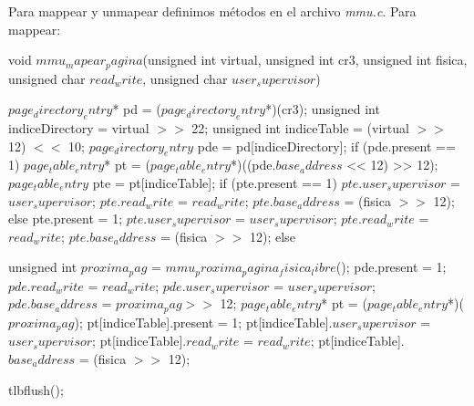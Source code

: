 Para mappear y unmapear definimos m\'etodos en el archivo \textit{mmu.c}.
Para mappear:
\begin{algorithmic}
    \State \tab void $mmu_mapear_pagina$(unsigned int virtual, unsigned int cr3, \State \tab unsigned int fisica, unsigned char $read_write$, unsigned char $user_supervisor$) {

  \State \tab \tab $page_directory_entry$* pd = ($page_directory_entry$*)(cr3);
  \State \tab \tab unsigned int indiceDirectory = virtual $>>$ 22;
  \State \tab \tab unsigned int indiceTable = (virtual $>>$ 12) $<<$ 10;
  \State \tab \tab $page_directory_entry$ pde = pd[indiceDirectory];
  \State \tab \tab if (pde.present == 1) {
    \State \tab \tab \tab $page_table_entry$* pt = ($page_table_entry$*)((pde.$base_address$ << 12) >> 12);
    \State \tab \tab \tab $page_table_entry$ pte = pt[indiceTable];
    \State \tab \tab \tab if (pte.present == 1) {
      \State \tab \tab \tab \tab $pte.user_supervisor$ = $user_supervisor$;
      \State \tab \tab \tab \tab $pte.read_write$ = $read_write$;
      \State \tab \tab \tab \tab $pte.base_address$ = (fisica $>>$ 12);
    \State \tab \tab \tab } else {
      \State \tab \tab \tab \tab pte.present = 1;
      \State \tab \tab \tab \tab $pte.user_supervisor$ = $user_supervisor$;
      \State \tab \tab \tab \tab $pte.read_write$ = $read_write$;
      \State \tab \tab \tab \tab $pte.base_address$ = (fisica $>>$ 12);
    \State \tab \tab \tab }
  \State \tab \tab } else {
    \State \tab \tab \tab unsigned int $proxima_pag$ = $mmu_proxima_pagina_fisica_libre$();
    \State \tab \tab \tab pde.present = 1;
    \State \tab \tab \tab $pde.read_write$ = $read_write$;
    \State \tab \tab \tab $pde.user_supervisor$ = $user_supervisor$;
    \State \tab \tab \tab $pde.base_address$ = $proxima_pag >>$ 12;
    \State \tab \tab \tab $page_table_entry$* pt = ($page_table_entry$*)($proxima_pag$);
    \State \tab \tab \tab pt[indiceTable].present = 1;
    \State \tab \tab \tab pt[indiceTable].$user_supervisor$ = $user_supervisor$;
    \State \tab \tab \tab pt[indiceTable].$read_write$ = $read_write$;
    \State \tab \tab \tab pt[indiceTable].$base_address$ = (fisica $>>$ 12);

\State \tab \tab  }

  \State \tab \tab tlbflush();
\State \tab }



\end{algorithmic}

